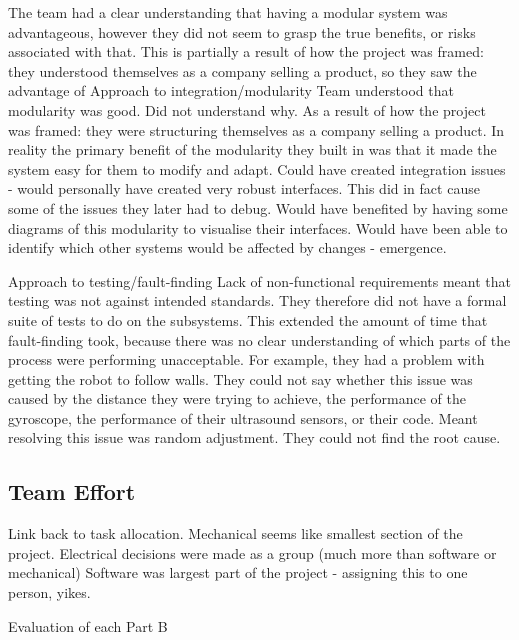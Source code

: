         The team had a clear understanding that having a modular system was advantageous, however they did not seem to grasp the true benefits, or risks associated with that.
        This is partially a result of how the project was framed: they understood themselves as a company selling a product, so they saw the advantage of
        Approach to integration/modularity
        Team understood that modularity was good.
        Did not understand why.
        As a result of how the project was framed: they were structuring themselves as a company selling a product.
        In reality the primary benefit of the modularity they built in was that it made the system easy for them to modify and adapt.
        Could have created integration issues - would personally have created very robust interfaces.
        This did in fact cause some of the issues they later had to debug.
        Would have benefited by having some diagrams of this modularity to visualise their interfaces.
        Would have been able to identify which other systems would be affected by changes - emergence.

        Approach to testing/fault-finding
        Lack of non-functional requirements meant that testing was not against intended standards.
        They therefore did not have a formal suite of tests to do on the subsystems.
        This extended the amount of time that fault-finding took, because there was no clear understanding of which parts of the process were performing unacceptable.
        For example, they had a problem with getting the robot to follow walls.
        They could not say whether this issue was caused by the distance they were trying to achieve, the performance of the gyroscope, the performance of their ultrasound sensors, or their code.
        Meant resolving this issue was random adjustment.
        They could not find the root cause.

    \subsection{Team Effort}\label{subsec:technical-effort}
        Link back to task allocation.
        Mechanical seems like smallest section of the project.
        Electrical decisions were made as a group (much more than software or mechanical)
        Software was largest part of the project - assigning this to one person, yikes.

        Evaluation of each Part B